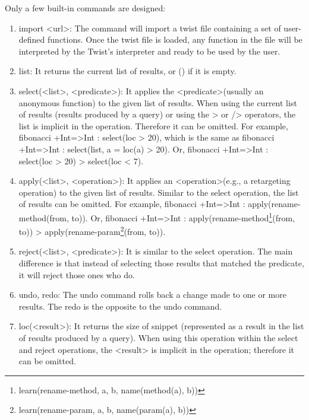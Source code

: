 Only a few built-in commands are designed:

\begin{enumerate}
	\item import <url>: The command will import a twist file containing a set of 
	user-defined functions. Once the twist file is loaded, any function in the file will 
	be interpreted by the Twist's interpreter and ready to be used by the user.
	
	\item list: It returns the current list of results, or () if it is empty.
	
	\item select(<list>, <predicate>): It applies the <predicate>(usually an anonymous function) 
	to the given list of results. When using the current list of results (results produced by a 
	query) or using the > or /> operators, the list is implicit in the operation. Therefore it can 
	be omitted. For example, fibonacci +Int=>Int : select(loc > 20), which is the same as 
	fibonacci +Int=>Int : select(list, a = loc(a) > 20). Or, fibonacci +Int=>Int : select(loc > 
	20) > select(loc < 7).
	
	\item apply(<list>, <operation>): It applies an <operation>(e.g., a retargeting operation) 
	to the given list of results. Similar to the select operation, the list of results can be 
	omitted. For example, fibonacci +Int=>Int : apply(rename-method(from, to)). Or, fibonacci 
	+Int=>Int : apply(rename-method\footnote{learn(rename-method, a, b, name(method(a), b))}(from, 
	to)) > apply(rename-param\footnote{learn(rename-param, a, b, name(param(a), b))}(from, to)).
		
	\item reject(<list>, <predicate>): It is similar to the select operation. The main difference 
	is that instead of selecting those results that matched the predicate, it will reject those 
	ones who do. 
	
	\item undo, redo: The undo command rolls back a change made to one or more results. 
	The redo is the opposite to the undo command.  
	
	\item loc(<result>): It returns the size of snippet (represented as a result in the 
	list of results produced by a query). When using this operation within the select and reject 
	operations, the <result> is implicit in the operation; therefore it can be omitted. 
	

\end{enumerate}

